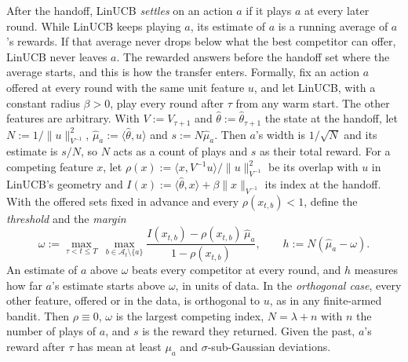 \documentclass[anon]{alt2027} %
\newif\ifrevmarks\revmarkstrue
\newenvironment{revised}{\ifrevmarks\color{revcolor}\fi}{}
\begin{document}
\begin{revised}
After the handoff, LinUCB \emph{settles} on an action $a$ if it plays $a$ at
every later round. While LinUCB keeps playing $a$, its estimate of $a$ is a
running average of $a$'s rewards. If that average never drops below what the
best competitor can offer, LinUCB never leaves $a$. The rewarded answers
before the handoff set where the average starts, and this is how the
transfer enters. Formally, fix an action $a$ offered at every round with the
same unit feature $u$, and let LinUCB, with a constant radius $\beta>0$,
play every round after $\tau$ from any warm start. The other features are
arbitrary. With $V:=V_{\tau+1}$ and $\widehat\theta:=\widehat\theta_{\tau+1}$
the state at the handoff, let $N:=1/\|u\|^2_{V^{-1}}$,
$\widehat\mu_a:=\langle\widehat\theta,u\rangle$ and $s:=N\widehat\mu_a$.
Then $a$'s width is $1/\sqrt N$ and its estimate is $s/N$, so $N$ acts as a
count of plays and $s$ as their total reward. For a competing feature $x$,
let $\rho(x):=\langle x,V^{-1}u\rangle/\|u\|^2_{V^{-1}}$ be its overlap with
$u$ in LinUCB's geometry and
$I(x):=\langle\widehat\theta,x\rangle+\beta\|x\|_{V^{-1}}$ its index at the
handoff. With the offered sets fixed in advance and every
$\rho(x_{t,b})<1$, define the \emph{threshold} and the \emph{margin}
\[
\omega:=\max_{\tau<t\le T}\ \max_{b\in\mathcal A_t\setminus\{a\}}
\frac{I(x_{t,b})-\rho(x_{t,b})\,\widehat\mu_a}{1-\rho(x_{t,b})},
\qquad h:=N(\widehat\mu_a-\omega).
\]
An estimate of $a$ above $\omega$ beats every competitor at every round, and
$h$ measures how far $a$'s estimate starts above $\omega$, in units of data.
In the \emph{orthogonal case}, every other feature, offered or in the data,
is orthogonal to $u$, as in any finite-armed bandit. Then $\rho\equiv0$,
$\omega$ is the largest competing index, $N=\lambda+n$ with $n$ the number
of plays of $a$, and $s$ is the reward they returned. Given the past, $a$'s
reward after $\tau$ has mean at least $\mu_a$ and $\sigma$-sub-Gaussian
deviations.
\end{revised}
\end{document}
